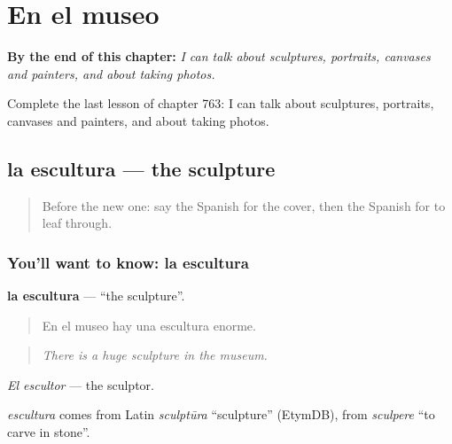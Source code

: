 
\chapter{En el museo}
\label{ch:es-en-el-museo}

\begin{chapteropening}
\textbf{By the end of this chapter:} \emph{I can talk about sculptures, portraits, canvases and painters, and about taking photos.}

Complete the last lesson of chapter 763: I can talk about sculptures, portraits, canvases and painters, and about taking photos.
\end{chapteropening}

\section[la escultura]{la escultura — the sculpture}

\label{lesson:ES-C763-escultura}



\begin{quote}
Before the new one: say the Spanish for the cover, then the Spanish for to leaf through.
\end{quote}

\subsection*{You'll want to know: la escultura}
\textbf{la escultura} — \textquotedblleft{}the sculpture\textquotedblright{}.

\begin{quote}
En el museo hay una escultura enorme.
\end{quote}

\begin{quote}
\emph{There is a huge sculpture in the museum.}
\end{quote}

\emph{El escultor} — the sculptor.

\begin{cousinweb}
\emph{escultura} comes from Latin \emph{sculptūra} \textquotedblleft{}sculpture\textquotedblright{} (EtymDB), from \emph{sculpere} \textquotedblleft{}to carve in stone\textquotedblright{}.
\end{cousinweb}

